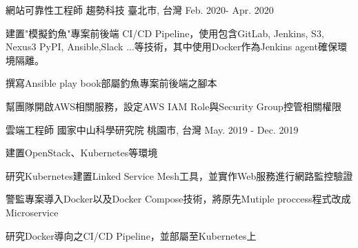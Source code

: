 
\begin{cventries}

  \cventry
    {網站可靠性工程師} %
    {趨勢科技} %
    {臺北市, 台灣} %
    {Feb. 2020- Apr. 2020} %
    {
      \begin{cvitems}  %
        \item {建置"模擬釣魚"專案前後端 CI/CD Pipeline，使用包含GitLab, Jenkins, S3, Nexus3 PyPI, Ansible,Slack ...等技術，其中使用Docker作為Jenkins agent確保環境隔離。}
        \item {撰寫Ansible play book部屬釣魚專案前後端之腳本}
        \item {幫團隊開啟AWS相關服務，設定AWS IAM Role與Security Group控管相關權限}
      \end{cvitems}
    }

  \cventry
    {雲端工程師} %
    {國家中山科學研究院} %
    {桃園市, 台灣} %
    {May. 2019 - Dec. 2019} %
    {
      \begin{cvitems} %
        \item {建置OpenStack、Kubernetes等環境}
        \item {研究Kubernetes建置Linked Service Mesh⼯具，並實作Web服務進行網路監控驗證}
        \item {警監專案導入Docker以及Docker Compose技術，將原先Mutiple proccess程式改成Microservice}
        \item {研究Docker導向之CI/CD Pipeline，並部屬至Kubernetes上}
      \end{cvitems}
    }

\end{cventries}
